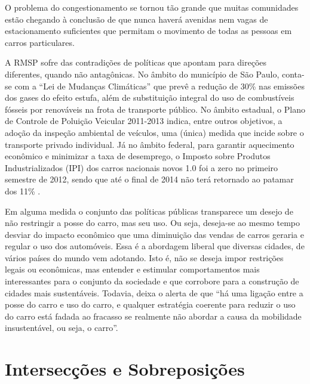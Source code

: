 \begin{citacao}
O problema do congestionamento se tornou tão grande que muitas comunidades estão chegando à conclusão de que nunca haverá avenidas nem vagas de estacionamento suficientes que permitam o movimento de todas as pessoas em carros particulares.
\end{citacao}

A RMSP sofre das contradições de políticas que apontam para direções diferentes, quando não antagônicas. No âmbito do município de São Paulo, conta-se com a ``Lei de Mudanças Climáticas'' \cite{LEICLIMASP2009} que prevê a redução de 30\% nas emissões dos gases do efeito estufa, além de substituição integral do uso de combustíveis fósseis por renováveis na frota de transporte público. No âmbito estadual, o Plano de Controle de Poluição Veicular 2011-2013 \cite{PCPV2011} indica, entre outros objetivos, a adoção da inspeção ambiental de veículos, uma (única) medida que incide sobre o transporte privado individual. Já no âmbito federal, para garantir aquecimento econômico e minimizar a taxa de desemprego, o Imposto sobre Produtos Industrializados (IPI) dos carros nacionais novos 1.0 foi a zero no primeiro semestre de 2012, sendo que até o final de 2014 não terá retornado ao patamar dos 11\% \cite{FAZENDA2014}.

Em alguma medida o conjunto das políticas públicas transparece um desejo de não restringir a posse do carro, mas seu uso. Ou seja, deseja-se ao mesmo tempo desviar do impacto econômico que uma diminuição das vendas de carros geraria e regular o uso dos automóveis. Essa é a abordagem liberal que diversas cidades, de vários países do mundo vem adotando. Isto é, não se deseja impor restrições legais ou econômicas, mas entender e estimular comportamentos mais interessantes para o conjunto da sociedade e que corrobore para a construção de cidades mais sustentáveis. Todavia,  deixa o alerta de que ``há uma ligação entre a posse do carro e uso do carro, e qualquer estratégia coerente para reduzir o uso do carro está fadada ao fracasso se realmente não abordar a causa da mobilidade insustentável, ou seja, o carro''.



\clearpage
\section{Intersecções e Sobreposições}

